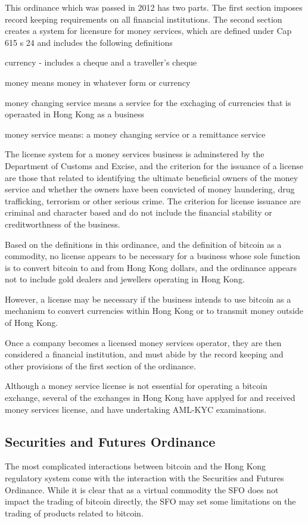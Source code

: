 This ordinance which was passed in 2012 has two parts.  The first
section imposes record keeping requirements on all financial
institutions.  The second section creates a system for licensure for
money services, which are defined under Cap 615 s 24 and includes the
following definitions

currency - includes a cheque and a traveller's cheque

money means money in whatever form or currency

money changing service means a service for the exchaging of currencies
that is operaated in Hong Kong as a business 

money service means: a money changing service or a remittance service

The license system for a money services business is adminstered by the
Department of Customs and Excise, and the criterion for the issuance
of a license are those that related to identifying the ultimate
beneficial owners of the money service and whether the owners have
been convicted of money laundering, drug trafficking, terrorism or
other serious crime.  The criterion for license issuance are criminal
and character based and do not include the financial stability or
creditworthness of the business.

Based on the definitions in this ordinance, and the definition of
bitcoin as a commodity, no license appears to be necessary for a
business whose sole function is to convert bitcoin to and from Hong
Kong dollars, and the ordinance appears not to include gold dealers
and jewellers operating in Hong Kong.

However, a license may be necessary if the business intends to use
bitcoin as a mechanism to convert currencies within Hong Kong or to
transmit money outside of Hong Kong.

Once a company becomes a licensed money services operator, they are
then considered a financial institution, and must abide by the record
keeping and other provisions of the first section of the ordinance.

Although a money service license is not essential for operating a
bitcoin exchange, several of the exchanges in Hong Kong have applyed
for and received money services license, and have undertaking AML-KYC
examinations. 

\subsection{Securities and Futures Ordinance}
The most complicated interactions between bitcoin and the Hong Kong
regulatory system come with the interaction with the Securities and
Futures Ordinance.  While it is clear that as a virtual commodity the
SFO does not impact the trading of bitcoin directly, the SFO may set
some limitations on the trading of products related to bitcoin.

